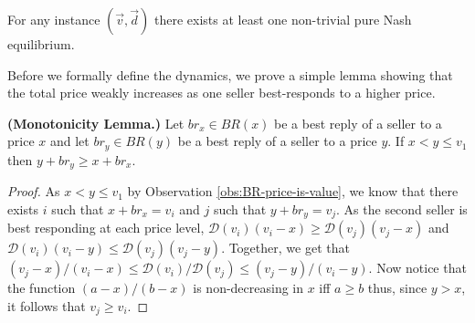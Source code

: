 
\begin{theorem}
\label{thm:existence}
		For any instance $(\vec{v},\vec{d})$ there exists at least one non-trivial pure Nash equilibrium.
\end{theorem}


Before we formally define the dynamics,
we prove a simple lemma showing that the total price weakly increases
as one seller best-responds to a higher price.



\begin{lemma}
\label{lemma:monotonicity-of-prices}
 \textbf{(Monotonicity Lemma.)}
	Let $br_x\in BR(x)$ be a best reply of a seller to a price $x$ and let $br_y\in BR(y)$ be a best reply of a seller to a price $y$.
	If $x<y\leq v_1$ then $y+br_y\geq x+br_x$.
\end{lemma}

\begin{proof}
	As $x<y\leq v_1$ by Observation \ref{obs:BR-price-is-value}, we know that there exists $i$ such that $x+br_x=v_i$ and $j$ such that $y+br_y=v_j$. %
As the second seller is best responding at each price level,
	$\mathcal{D}(v_i) (v_i - x) \ge \mathcal{D}(v_j) (v_j - x)$ and $\mathcal{D}(v_i)(v_i - y) \le \mathcal{D}(v_j) (v_j - y)$. Together, we get that $(v_j-x)/(v_i-x) \le \mathcal{D}(v_i)/\mathcal{D}(v_j) \le (v_j-y)/(v_i-y)$.
	Now notice that the function $(a-x)/(b-x)$ is non-decreasing in $x$ iff $a \ge b$ thus, since $y>x$, it
	follows that $v_j \ge v_i$.
\end{proof}



